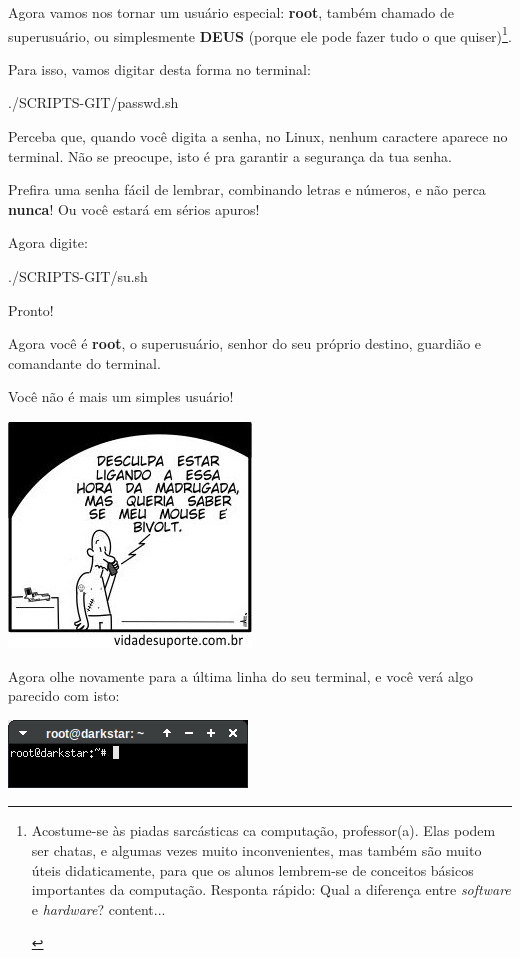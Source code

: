 \begin{multicols}{2}
Agora vamos nos tornar um usuário especial: \textbf{root}, também chamado de superusuário, ou simplesmente \textbf{DEUS} (porque ele pode fazer tudo o que quiser)\footnote{\begin{multicols}{2}{Acostume-se às piadas sarcásticas ca computação, professor(a). Elas podem ser chatas, e algumas vezes muito inconvenientes, mas também são muito úteis didaticamente, para que os alunos lembrem-se de conceitos básicos importantes da computação. Responta rápido: Qual a diferença entre \textit{software} e \textit{hardware}?}
		content...
\end{multicols}}.

Para isso, vamos digitar desta forma no terminal:

	
{./SCRIPTS-GIT/passwd.sh}

Perceba que, quando você digita a senha, no Linux, nenhum caractere aparece no terminal. Não se preocupe, isto é pra garantir a segurança da tua senha.

Prefira uma senha fácil de lembrar, combinando letras e números, e não perca \textbf{nunca}! Ou você estará em sérios apuros!

Agora digite:

	
{./SCRIPTS-GIT/su.sh}

Pronto!

Agora você é \textbf{root}, o superusuário, senhor do seu próprio destino, guardião e comandante do terminal.

Você não é mais um simples usuário!

\begin{center}
	\includegraphics[width=.4\linewidth]{./IMG-GIT/Suporte_643.jpg}
\end{center}	

	Agora olhe novamente para a última linha do seu terminal, e você verá algo parecido com isto:
	
	\begin{center}
		\includegraphics[width=.6\linewidth]{./IMG-GIT/Screenshot_20231222_155332.png}
	\end{center}	


\end{multicols}
